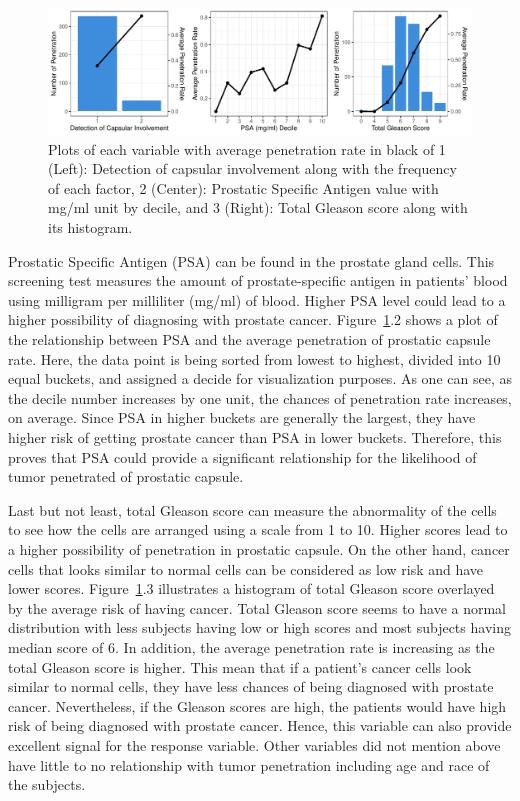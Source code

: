\documentclass[11pt]{article}\usepackage[]{graphicx}\usepackage[]{color}
\makeatletter
\def\maxwidth{ %
  \ifdim\Gin@nat@width>\linewidth
    \linewidth
  \else
    \Gin@nat@width
  \fi
}
\makeatother
\begin{document}
\begin{figure}[h!] 
\begin{center}

\includegraphics[width=\maxwidth]{figure/unnamed-chunk-2-1} 

\caption{Plots of each variable with average penetration rate in black of 1 (Left): Detection of capsular involvement along with the frequency of each factor, 2 (Center): Prostatic Specific Antigen value with mg/ml unit by decile, and 3 (Right): Total Gleason score along with its histogram.}
\label{explore2}
\end{center} 
\end{figure}

Prostatic Specific Antigen (PSA) can be found in the prostate gland cells. This screening test measures the amount of prostate-specific antigen in patients' blood using milligram per milliliter (mg/ml) of blood. Higher PSA level could lead to a higher possibility of diagnosing with prostate cancer. Figure~\ref{explore2}.2 shows a plot of the relationship between PSA and the average penetration of prostatic capsule rate. Here, the data point is being sorted from lowest to highest, divided into 10 equal buckets, and assigned a decide for visualization purposes. As one can see, as the decile number increases by one unit, the chances of penetration rate increases, on average. Since PSA in higher buckets are generally the largest, they have higher risk of getting prostate cancer than PSA in lower buckets. Therefore, this proves that PSA could provide a significant relationship for the likelihood of tumor penetrated of prostatic capsule.
\hfill \break

\noindent Last but not least, total Gleason score can measure the abnormality of the cells to see how the cells are arranged using a scale from 1 to 10. Higher scores lead to a higher possibility of penetration in prostatic capsule. On the other hand, cancer cells that looks similar to normal cells can be considered as low risk and have lower scores. Figure~\ref{explore2}.3 illustrates a histogram of total Gleason score overlayed by the average risk of having cancer. Total Gleason score seems to have a normal distribution with less subjects having low or high scores and most subjects having median score of 6. In addition, the average penetration rate is increasing as the total Gleason score is higher. This mean that if a patient's cancer cells look similar to normal cells, they have less chances of being diagnosed with prostate cancer. Nevertheless, if the Gleason scores are high, the patients would have high risk of being diagnosed with prostate cancer. Hence, this variable can also provide excellent signal for the response variable. Other variables did not mention above have little to no relationship with tumor penetration including age and race of the subjects.  
\hfill \break
\end{document}
